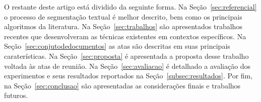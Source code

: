 O restante deste artigo está dividido da seguinte forma. 
%
Na Seção~\ref{sec:referencial} o processo de segmentação textual é melhor descrito, bem como os principais algoritmos da literatura. 
%
Na Seção~\ref{sec:trabalhos} são apresentados trabalhos recentes que desenvolveram as técnicas existentes em contextos específicos. 
%
Na Seção~\ref{sec:conjutodedocumentos} as atas são descritas em suas principais caraterísticas.
%
Na Seção~\ref{sec:proposta} é apresentada a proposta desse trabalho voltada às atas de reunião. 
Na Seção~\ref{sec:avaliacao} é detalhado a avaliação dos experimentos e seus resultados reportados na Seção~\ref{subsec:resultados}. 
%
Por fim, na Seção~\ref{sec:conclusao} são apresentadas as considerações finais e trabalhos futuros.


























